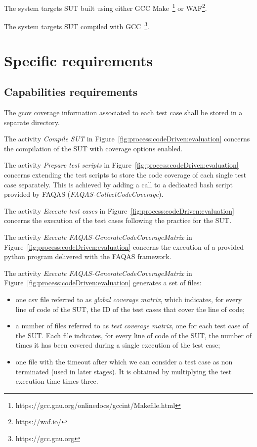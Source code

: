 \RQ{} The system targets SUT built using either GCC Make~\footnote{https://gcc.gnu.org/onlinedocs/gccint/Makefile.html} or WAF\footnote{https://waf.io/}.

\RQ{} The system targets SUT compiled with GCC~\footnote{https://gcc.gnu.org}.

\section{Specific requirements}
\subsection{Capabilities requirements}
\label{sec:rquirements:capabilities}

\RQ{} The gcov coverage information associated to each test case shall be stored in a separate directory.

\RQ{} The activity \emph{Compile SUT} in Figure~\ref{fig:process:codeDriven:evaluation} concerns the compilation of  the SUT with coverage options enabled.

\RQ{} The activity \emph{Prepare test scripts} in Figure~\ref{fig:process:codeDriven:evaluation} concerns extending the test scripts to store the code coverage of each single test case separately. This is achieved by adding a call to a dedicated bash script provided by FAQAS (\emph{FAQAS-CollectCodeCoverage}).

\RQ{} The activity \emph{Execute test cases} in Figure~\ref{fig:process:codeDriven:evaluation} concerns the execution of the test cases following the practice for the SUT.

\RQ{} The activity \emph{Execute FAQAS-GenerateCodeCoverageMatrix} in Figure~\ref{fig:process:codeDriven:evaluation} concerns the execution of a provided python program delivered with the FAQAS framework.

\RQ{} The activity \emph{Execute FAQAS-GenerateCodeCoverageMatrix} in Figure~\ref{fig:process:codeDriven:evaluation} generates a set of files: 
\begin{itemize}
\item one csv file referred to as \emph{global coverage matrix}, which indicates, for every line of code of the SUT, the ID of the test cases that cover the line of code;
\item a number of files  referred to as \emph{test coverage matrix}, one for each test case of the SUT. Each file indicates, for every line of code of the SUT, the number of times it has been covered during a single execution of the test case;
\item one file with the timeout after which we can consider a test case as non terminated (used in later stages). It is obtained by multiplying the test execution time times three.
\end{itemize}



